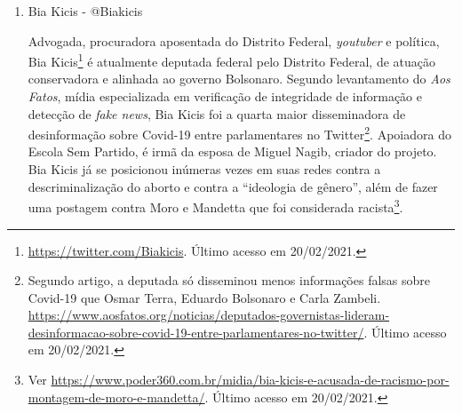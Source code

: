\documentclass[
	12pt,				%
	openright,			%
	twoside,			%
	a4paper,			%
	english,			%
	brazil				%
	]{abntex2}
\begin{document}
\begin{anexosenv}
\begin{enumerate}
 
 \begin{figure}[!htbp]
    \centering
    \texttt{[image: arthurweint\_2.png]}
    \caption{Postagem no Twitter de Arthur Weintraub, em resposta a usuária que o chamou de ``babaca''. Disponível em \url{https://twitter.com/ArthurWeint/status/1190701724014727169}. Último acesso em 20/02/2021.}
 \end{figure}
 
  \item Bia Kicis - @Biakicis
  
  Advogada, procuradora aposentada do Distrito Federal, \textit{youtuber} e política, Bia Kicis\footnote{\url{https://twitter.com/Biakicis}. Último acesso em 20/02/2021.} é atualmente deputada federal pelo Distrito Federal, de atuação conservadora e alinhada ao governo Bolsonaro. Segundo levantamento do \textit{Aos Fatos}, mídia especializada em verificação de integridade de informação e detecção de \textit{fake news}, Bia Kicis foi a quarta maior disseminadora de desinformação sobre Covid-19 entre parlamentares no Twitter\footnote{Segundo artigo, a deputada só disseminou menos informações falsas sobre Covid-19 que Osmar Terra, Eduardo Bolsonaro e Carla Zambeli. \url{https://www.aosfatos.org/noticias/deputados-governistas-lideram-desinformacao-sobre-covid-19-entre-parlamentares-no-twitter/}. Último acesso em 20/02/2021.}. Apoiadora do Escola Sem Partido, é irmã da esposa de Miguel Nagib, criador do projeto. Bia Kicis já se posicionou inúmeras vezes em suas redes contra a descriminalização do aborto e contra a ``ideologia de gênero'', além de fazer uma postagem contra Moro e Mandetta que foi considerada racista\footnote{Ver \url{https://www.poder360.com.br/midia/bia-kicis-e-acusada-de-racismo-por-montagem-de-moro-e-mandetta/}. Último acesso em 20/02/2021.}.
 
 

\end{enumerate}
\end{anexosenv}
\end{document}
